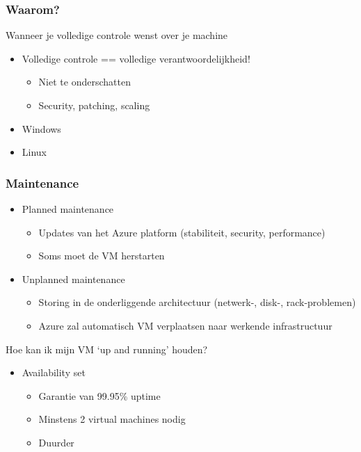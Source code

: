 \documentclass{article}
\begin{document}
\subsubsection{Waarom?}
Wanneer je volledige controle wenst over je machine

\begin{itemize}
    \item Volledige controle == volledige verantwoordelijkheid!
    \begin{itemize}
        \item Niet te onderschatten
        \item Security, patching, scaling
    \end{itemize}
    \item Windows
    \item Linux
\end{itemize}

\subsubsection{Maintenance}

\begin{itemize}
    \item Planned maintenance
    \begin{itemize}
        \item Updates van het Azure platform (stabiliteit, security, performance)
        \item Soms moet de VM herstarten
    \end{itemize}
    \item Unplanned maintenance
    \begin{itemize}
        \item Storing in de onderliggende architectuur (netwerk-, disk-, rack-problemen)
        \item Azure zal automatisch VM verplaatsen naar werkende infrastructuur
    \end{itemize}
\end{itemize}

Hoe kan ik mijn VM `up and running' houden?
\begin{itemize}
    \item Availability set
    \begin{itemize}
        \item Garantie van 99.95\% uptime
        \item Minstens 2 virtual machines nodig
        \item Duurder
    \end{itemize}
\end{itemize}
\end{document}
